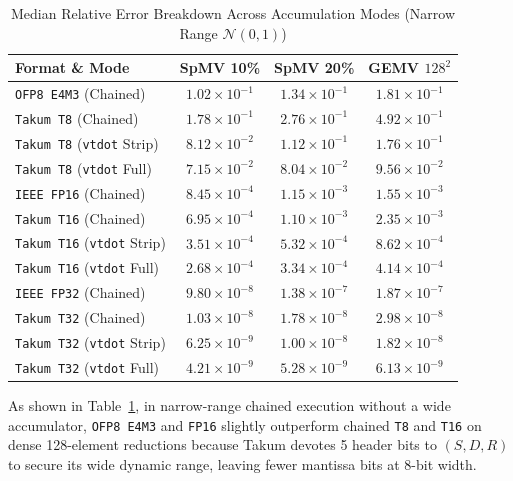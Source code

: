 \documentclass[conference]{IEEEtran}
\begin{document}
\begin{table}[htbp]
\centering
\caption{Median Relative Error Breakdown Across Accumulation Modes (Narrow Range $\mathcal{N}(0,1)$)}
\label{tab:gemv_spmv_breakdown}
\begin{tabular}{lccc}
\hline
\textbf{Format \& Mode} & \textbf{SpMV 10\%} & \textbf{SpMV 20\%} & \textbf{GEMV $128^2$} \\
\hline
\texttt{OFP8 E4M3} (Chained) & $1.02 \times 10^{-1}$ & $1.34 \times 10^{-1}$ & $1.81 \times 10^{-1}$ \\
\texttt{Takum T8} (Chained) & $1.78 \times 10^{-1}$ & $2.76 \times 10^{-1}$ & $4.92 \times 10^{-1}$ \\
\texttt{Takum T8} (\texttt{vtdot} Strip) & $8.12 \times 10^{-2}$ & $1.12 \times 10^{-1}$ & $1.76 \times 10^{-1}$ \\
\texttt{Takum T8} (\texttt{vtdot} Full) & $7.15 \times 10^{-2}$ & $8.04 \times 10^{-2}$ & $9.56 \times 10^{-2}$ \\
\hline
\texttt{IEEE FP16} (Chained) & $8.45 \times 10^{-4}$ & $1.15 \times 10^{-3}$ & $1.55 \times 10^{-3}$ \\
\texttt{Takum T16} (Chained) & $6.95 \times 10^{-4}$ & $1.10 \times 10^{-3}$ & $2.35 \times 10^{-3}$ \\
\texttt{Takum T16} (\texttt{vtdot} Strip) & $3.51 \times 10^{-4}$ & $5.32 \times 10^{-4}$ & $8.62 \times 10^{-4}$ \\
\texttt{Takum T16} (\texttt{vtdot} Full) & $2.68 \times 10^{-4}$ & $3.34 \times 10^{-4}$ & $4.14 \times 10^{-4}$ \\
\hline
\texttt{IEEE FP32} (Chained) & $9.80 \times 10^{-8}$ & $1.38 \times 10^{-7}$ & $1.87 \times 10^{-7}$ \\
\texttt{Takum T32} (Chained) & $1.03 \times 10^{-8}$ & $1.78 \times 10^{-8}$ & $2.98 \times 10^{-8}$ \\
\texttt{Takum T32} (\texttt{vtdot} Strip) & $6.25 \times 10^{-9}$ & $1.00 \times 10^{-8}$ & $1.82 \times 10^{-8}$ \\
\texttt{Takum T32} (\texttt{vtdot} Full) & $4.21 \times 10^{-9}$ & $5.28 \times 10^{-9}$ & $6.13 \times 10^{-9}$ \\
\hline
\end{tabular}
\end{table}

As shown in Table~\ref{tab:gemv_spmv_breakdown}, in narrow-range chained execution without a wide accumulator, \texttt{OFP8 E4M3} and \texttt{FP16} slightly outperform chained \texttt{T8} and \texttt{T16} on dense 128-element reductions because Takum devotes 5 header bits to $(S, D, R)$ to secure its wide dynamic range, leaving fewer mantissa bits at 8-bit width.
\end{document}
